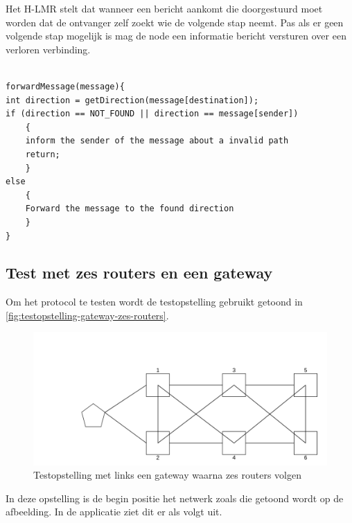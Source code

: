 \documentclass[a4paper, 11pt, oneside]{report}
\begin{document}
Het H-LMR stelt dat wanneer een bericht aankomt die doorgestuurd moet worden dat de ontvanger zelf zoekt wie de volgende stap neemt.
Pas als er geen volgende stap mogelijk is mag de node een informatie bericht versturen over een verloren verbinding.

\begin{lstlisting}

forwardMessage(message){
int direction = getDirection(message[destination]);
if (direction == NOT_FOUND || direction == message[sender])
	{
	inform the sender of the message about a invalid path
	return;
	}
else 
	{
	Forward the message to the found direction
	}	
}

\end{lstlisting}

\subsection{Test met zes routers en een gateway}

Om het protocol te testen wordt de testopstelling gebruikt getoond in \autoref{fig:testopstelling-gateway-zes-routers}.

\begin{figure}[H]
	\begin{center}\includegraphics[width=1\linewidth]{Afbeeldingen/testopstelling1.png}\end{center}
	\caption{Testopstelling met links een gateway waarna zes routers volgen}
	\label{fig:testopstelling-gateway-zes-routers}
\end{figure}

In deze opstelling is de begin positie het netwerk zoals die getoond wordt op de afbeelding.
In de applicatie ziet dit er als volgt uit.
\end{document}
